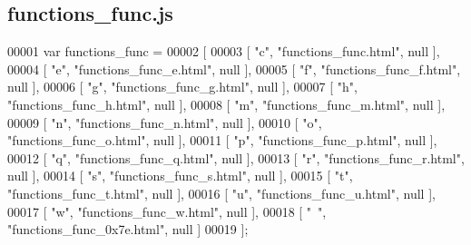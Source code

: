 \subsection{functions\+\_\+func.\+js}
\label{functions__func_8js_source}

\begin{DoxyCode}
00001 var functions_func =
00002 [
00003     [ \textcolor{stringliteral}{"c"}, \textcolor{stringliteral}{"functions\_func.html"}, null ],
00004     [ \textcolor{stringliteral}{"e"}, \textcolor{stringliteral}{"functions\_func\_e.html"}, null ],
00005     [ \textcolor{stringliteral}{"f"}, \textcolor{stringliteral}{"functions\_func\_f.html"}, null ],
00006     [ \textcolor{stringliteral}{"g"}, \textcolor{stringliteral}{"functions\_func\_g.html"}, null ],
00007     [ \textcolor{stringliteral}{"h"}, \textcolor{stringliteral}{"functions\_func\_h.html"}, null ],
00008     [ \textcolor{stringliteral}{"m"}, \textcolor{stringliteral}{"functions\_func\_m.html"}, null ],
00009     [ \textcolor{stringliteral}{"n"}, \textcolor{stringliteral}{"functions\_func\_n.html"}, null ],
00010     [ \textcolor{stringliteral}{"o"}, \textcolor{stringliteral}{"functions\_func\_o.html"}, null ],
00011     [ \textcolor{stringliteral}{"p"}, \textcolor{stringliteral}{"functions\_func\_p.html"}, null ],
00012     [ \textcolor{stringliteral}{"q"}, \textcolor{stringliteral}{"functions\_func\_q.html"}, null ],
00013     [ \textcolor{stringliteral}{"r"}, \textcolor{stringliteral}{"functions\_func\_r.html"}, null ],
00014     [ \textcolor{stringliteral}{"s"}, \textcolor{stringliteral}{"functions\_func\_s.html"}, null ],
00015     [ \textcolor{stringliteral}{"t"}, \textcolor{stringliteral}{"functions\_func\_t.html"}, null ],
00016     [ \textcolor{stringliteral}{"u"}, \textcolor{stringliteral}{"functions\_func\_u.html"}, null ],
00017     [ \textcolor{stringliteral}{"w"}, \textcolor{stringliteral}{"functions\_func\_w.html"}, null ],
00018     [ \textcolor{stringliteral}{"~"}, \textcolor{stringliteral}{"functions\_func\_0x7e.html"}, null ]
00019 ];
\end{DoxyCode}
